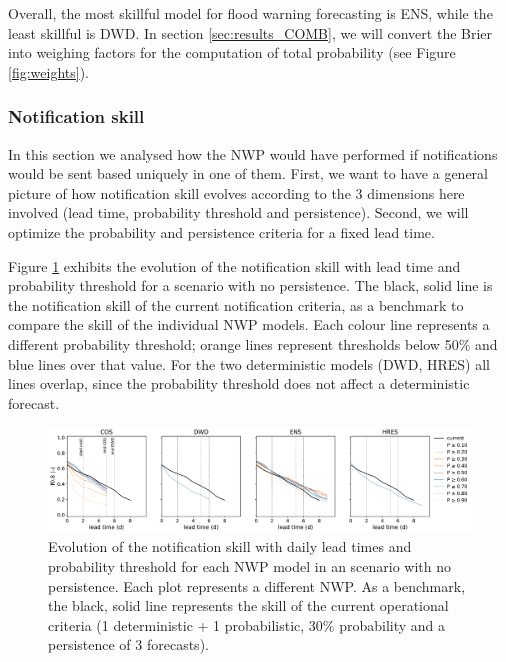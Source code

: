 \documentclass[preprint,12pt,authoryear]{elsarticle}
\begin{document}
Overall, the most skillful model for flood warning forecasting is ENS, while the least skillful is DWD. In section \ref{sec:results_COMB}, we will convert the Brier into weighing factors for the computation of total probability (see Figure \ref{fig:weights}).

\subsubsection{Notification skill}
\label{sec:NWP_skill}

In this section we analysed how the NWP would have performed if notifications would be sent based uniquely in one of them. First, we want to have a general picture of how notification skill evolves according to the 3 dimensions here involved (lead time, probability threshold and persistence). Second, we will optimize the probability and persistence criteria for a fixed lead time.

Figure \ref{fig:NWP_skill_leadtime} exhibits the evolution of the notification skill with lead time and probability threshold for a scenario with no persistence. The black, solid line is the notification skill of the current notification criteria, as a benchmark to compare the skill of the individual NWP models. Each colour line represents a different probability threshold; orange lines represent thresholds below 50\% and blue lines over that value. For the two deterministic models (DWD, HRES) all lines overlap, since the probability threshold does not affect a deterministic forecast.

\begin{figure}
    \centering
    \includegraphics[width=1\textwidth]{figures/skill_probability_leadtime_1-1_NWP.pdf}
    \caption{Evolution of the notification skill with daily lead times and probability threshold for each NWP model in an scenario with no persistence. Each plot represents a different NWP. As a benchmark, the black, solid line represents the skill of the current operational criteria (1 deterministic + 1 probabilistic, 30\% probability and a persistence of 3 forecasts).}
    \label{fig:NWP_skill_leadtime}
\end{figure}
\end{document}
